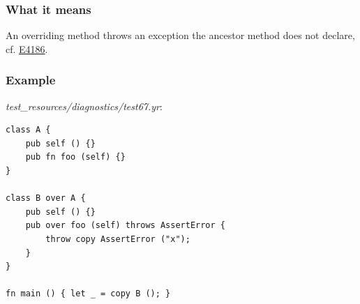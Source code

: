 \subsubsection*{What it means}

An overriding method throws an exception the ancestor method does not declare, cf. \hyperref[sec:codes:e4186]{E4186}.

\subsubsection*{Example}

\textit{test\_\allowbreak{}resources/\allowbreak{}diagnostics/\allowbreak{}test67.yr}:

\begin{lstlisting}[style=coloredverbatimError]
class A {
    pub self () {}
    pub fn foo (self) {}
}

class B over A {
    pub self () {}
    pub over foo (self) throws AssertError {
        throw copy AssertError ("x");
    }
}

fn main () { let _ = copy B (); }
\end{lstlisting}

